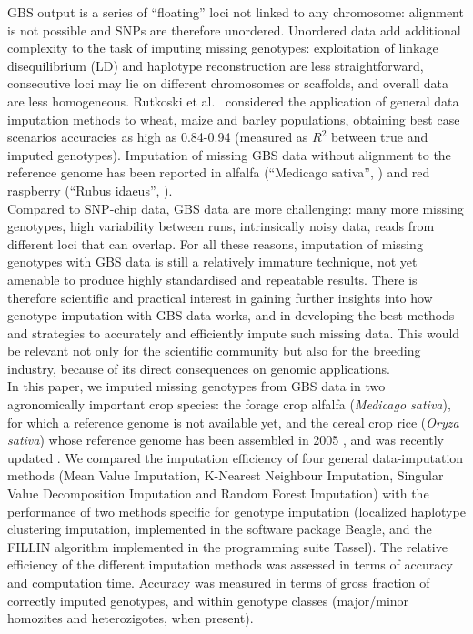 GBS output is a series of ``floating'' loci not linked to any chromosome:
alignment is not possible and SNPs are therefore unordered. Unordered 
data add additional complexity to the task of imputing missing genotypes: 
exploitation of linkage disequilibrium (LD) and haplotype reconstruction 
are less straightforward, consecutive loci may lie on different chromosomes
or scaffolds, and overall data are less homogeneous. Rutkoski et al.~\cite{rutkoski_imputation_2013}
considered the application of general data imputation methods 
to wheat, maize and barley populations, obtaining best case scenarios accuracies 
as high as 0.84-0.94 (measured as $R^{2}$ between true and imputed genotypes). Imputation of missing GBS data without alignment to the reference genome has been reported in alfalfa (``Medicago sativa'', \cite{Rocher_validation_2015}) and red raspberry (``Rubus idaeus'', \cite{ward_2013_saturated}).\\
Compared to SNP-chip data, GBS data are more challenging: many more 
missing genotypes, high variability between runs, intrinsically noisy data, 
reads from different loci that can overlap. For all these reasons, imputation 
of missing genotypes with GBS data is still a relatively immature technique, 
not yet amenable to produce highly standardised and repeatable results. 
There is therefore scientific and practical interest in gaining further 
insights into how genotype imputation with GBS data works, and in 
developing the best methods and strategies to accurately and efficiently 
impute such missing data. This would be relevant not only for the scientific 
community but also for the breeding industry, because of its direct 
consequences on genomic applications.\\
In this paper, we imputed missing genotypes from GBS data in two agronomically
important crop species: the forage crop alfalfa (\emph{Medicago sativa}), for 
which a reference genome is not available yet, and the 
cereal crop rice (\emph{Oryza sativa}) whose reference genome has been 
assembled in 2005 \cite{international_rice_genome_sequencing_project_map-based_2005}, and
was recently updated \cite{kawahara_improvement_2013}. We compared the imputation 
efficiency of four general data-imputation methods (Mean Value Imputation, 
K-Nearest Neighbour Imputation, Singular Value Decomposition Imputation 
and Random Forest Imputation) with the performance of two methods specific 
for genotype imputation (localized haplotype clustering imputation, 
implemented in the software package Beagle, %
and the FILLIN algorithm implemented in the programming suite Tassel). The relative efficiency of 
the different imputation methods was assessed in terms of  
accuracy and computation time. Accuracy was measured in terms
of gross fraction of correctly imputed genotypes, and within
genotype classes (major/minor homozites and heterozigotes, when present).
